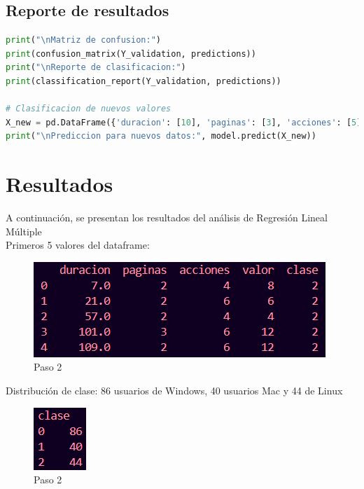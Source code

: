 \documentclass{article}
\begin{document}
\subsection{Reporte de resultados}
\begin{lstlisting}[language=Python]
print("\nMatriz de confusion:")
print(confusion_matrix(Y_validation, predictions))
print("\nReporte de clasificacion:")
print(classification_report(Y_validation, predictions))

# Clasificacion de nuevos valores
X_new = pd.DataFrame({'duracion': [10], 'paginas': [3], 'acciones': [5], 'valor': [9]})
print("\nPrediccion para nuevos datos:", model.predict(X_new))
\end{lstlisting}

\newpage
\section{Resultados}
A continuación, se presentan los resultados del análisis de Regresión Lineal Múltiple\\

Primeros 5 valores del dataframe:
\begin{figure}[H]
    \centering
    \includegraphics[width=0.6\linewidth]{img/a11_dataframe.png}
    \caption{Paso 2}
    \label{fig:figure2}
\end{figure}

Distribución de clase: 86 usuarios de Windows, 40 usuarios Mac y 44 de Linux 
\begin{figure}[H]
    \centering
    \includegraphics[width=0.1\linewidth]{img/a11_clase.png}
    \caption{Paso 2}
    \label{fig:figure2}
\end{figure}
\end{document}
